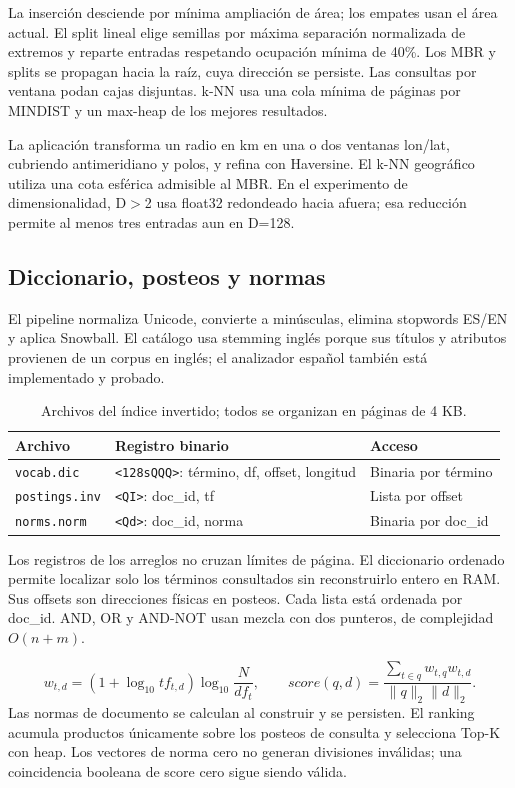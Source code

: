 \documentclass[11pt,a4paper]{article}
\newcommand{\code}[1]{\texttt{#1}}
\begin{document}
La inserción desciende por mínima ampliación de área; los empates usan el área actual. El split lineal elige semillas por máxima separación normalizada de extremos y reparte entradas respetando ocupación mínima de 40\%. Los MBR y splits se propagan hacia la raíz, cuya dirección se persiste. Las consultas por ventana podan cajas disjuntas. k-NN usa una cola mínima de páginas por MINDIST y un max-heap de los mejores resultados.

La aplicación transforma un radio en km en una o dos ventanas lon/lat, cubriendo antimeridiano y polos, y refina con Haversine. El k-NN geográfico utiliza una cota esférica admisible al MBR. En el experimento de dimensionalidad, D$>$2 usa float32 redondeado hacia afuera; esa reducción permite al menos tres entradas aun en D=128.

\subsection{Diccionario, posteos y normas}
El pipeline normaliza Unicode, convierte a minúsculas, elimina stopwords ES/EN y aplica Snowball. El catálogo usa stemming inglés porque sus títulos y atributos provienen de un corpus en inglés; el analizador español también está implementado y probado.

\begin{table}[H]\centering\small
\begin{tabular}{@{}lll@{}}\toprule
Archivo & Registro binario & Acceso\\\midrule
\code{vocab.dic} & \code{<128sQQQ>}: término, df, offset, longitud & Binaria por término\\
\code{postings.inv} & \code{<QI>}: doc\_id, tf & Lista por offset\\
\code{norms.norm} & \code{<Qd>}: doc\_id, norma & Binaria por doc\_id\\\bottomrule
\end{tabular}\caption{Archivos del índice invertido; todos se organizan en páginas de 4 KB.}
\end{table}

Los registros de los arreglos no cruzan límites de página. El diccionario ordenado permite localizar solo los términos consultados sin reconstruirlo entero en RAM. Sus offsets son direcciones físicas en posteos. Cada lista está ordenada por doc\_id. AND, OR y AND-NOT usan mezcla con dos punteros, de complejidad $O(n+m)$.

\[
w_{t,d}=(1+\log_{10}tf_{t,d})\log_{10}\frac{N}{df_t},\qquad
score(q,d)=\frac{\sum_{t\in q} w_{t,q}w_{t,d}}{\lVert q\rVert_2\lVert d\rVert_2}.
\]
Las normas de documento se calculan al construir y se persisten. El ranking acumula productos únicamente sobre los posteos de consulta y selecciona Top-K con heap. Los vectores de norma cero no generan divisiones inválidas; una coincidencia booleana de score cero sigue siendo válida.
\end{document}
